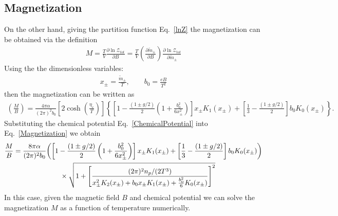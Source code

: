 \documentclass[Universe,article,submit,moreauthors,pdftex]{Definitions/mdpi}
\newcommand*{\req}[1]{Eq.~{\eqref{#1}}}
\begin{document}
\subsection{Magnetization}
On the other hand, giving the partition function \req{lnZ} the magnetization can be obtained via the definition
\begin{align}
M=\frac{T}{V}\frac{\partial \ln\mathcal{Z}_{tot}}{\partial B}=\frac{T}{V}\left(\frac{\partial\tilde m_\pm}{\partial B}\right)\frac{\partial \ln\mathcal{Z}_{tot}}{\partial\tilde m_\pm}
\end{align}
Using the the dimensionless variables:
\begin{align}
x_\pm=\frac{\tilde m_\pm}{T},\qquad b_0=\frac{eB}{T^2}
\end{align}
then the magnetization can be written as
\begin{align}\label{Magnetization}
\left(\frac{M}{B}\right)=\frac{4\pi\alpha}{(2\pi)^2b_0}\left[2\cosh\left(\frac{\eta_{e}}{T}\right)\right]\left\{\left[1-\frac{(1\pm g/2)}{2}\left(1+\frac{b^2_0}{6x^2_\pm}\right)\right]x_\pm K_1(x_\pm)+\left[\frac{1}{3}-\frac{(1\pm g/2)}{2}\right]b_0K_0(x_\pm)\right\}.
\end{align}
Substituting the chemical potential \req{ChemicalPotential} into \req{Magnetization} we obtain
\begin{align}
\frac{M}{B}=\frac{8\pi\alpha}{(2\pi)^2b_0}&{\left(\left[1-\frac{(1\pm g/2)}{2}\left(1+\frac{b^2_0}{6x^2_\pm}\right)\right]x_\pm K_1(x_\pm)+\left[\frac{1}{3}-\frac{(1\pm g/2)}{2}\right]b_0K_0(x_\pm)\right)}\notag\\
&\qquad\times\sqrt{1+\left[\frac{{(2\pi)^2n_p}/{(2T^3)}}{x_\pm^2K_2(x_\pm)+b_0x_\pm K_1(x_\pm)+\frac{b^2_0}{6}K_0(x_\pm)}\right]^2}
\end{align}
In this case, given the magnetic field $B$ and chemical potential we can solve the magnetization $M$ as a function of temperature numerically.
\end{document}
